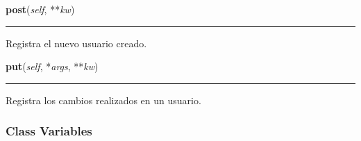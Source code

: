     \vspace{0.5ex}

\hspace{.8\funcindent}\begin{boxedminipage}{\funcwidth}

    \raggedright \textbf{post}(\textit{self}, **\textit{kw})

    \vspace{-1.5ex}

    \rule{\textwidth}{0.5\fboxrule}
\setlength{\parskip}{2ex}
    Registra el nuevo usuario creado.

\setlength{\parskip}{1ex}
    \end{boxedminipage}

    \label{saip:controllers:usuario_controller:UsuarioController:put}

    \vspace{0.5ex}

\hspace{.8\funcindent}\begin{boxedminipage}{\funcwidth}

    \raggedright \textbf{put}(\textit{self}, *\textit{args}, **\textit{kw})

    \vspace{-1.5ex}

    \rule{\textwidth}{0.5\fboxrule}
\setlength{\parskip}{2ex}
    Registra los cambios realizados en un usuario.

\setlength{\parskip}{1ex}
    \end{boxedminipage}



  \subsubsection{Class Variables}

